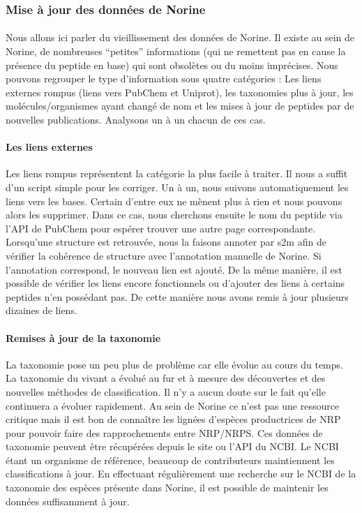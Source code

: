 \documentclass[12pt,french,twoside]{report}
\begin{document}
\subsubsection{Mise à jour des données de Norine}

\paragraph{}Nous allons ici parler du vieillissement des données de Norine.
Il existe au sein de Norine, de nombreuses ``petites'' informations (qui ne remettent pas en cause la présence du peptide en base) qui sont obsolètes ou du moins imprécises.
Nous pouvons regrouper le type d'information sous quatre catégories : Les liens externes rompus (liens vers PubChem et Uniprot), les taxonomies plus à jour, les molécules/organismes ayant changé de nom et les mises à jour de peptides par de nouvelles publications.
Analysons un à un chacun de ces cas.


\paragraph{Les liens externes}
Les liens rompus représentent la catégorie la plus facile à traiter.
Il nous a suffit d'un script simple pour les corriger.
Un à un, nous suivons automatiquement les liens vers les bases.
Certain d'entre eux ne mènent plus à rien et nous pouvons alors les supprimer.
Dans ce cas, nous cherchons ensuite le nom du peptide via l'API de PubChem pour espérer trouver une autre page correspondante.
Lorsqu'une structure est retrouvée, nous la faisons annoter par s2m afin de vérifier la cohérence de structure avec l'annotation manuelle de Norine.
Si l'annotation correspond, le nouveau lien est ajouté.
De la même manière, il est possible de vérifier les liens encore fonctionnels ou d'ajouter des liens à certains peptides n'en possédant pas.
De cette manière nous avons remis à jour plusieurs dizaines de liens.


\paragraph{Remises à jour de la taxonomie}
La taxonomie pose un peu plus de problème car elle évolue au cours du temps.
La taxonomie du vivant a évolué au fur et à mesure des découvertes et des nouvelles méthodes de classification.
Il n'y a aucun doute sur le fait qu'elle continuera a évoluer rapidement.
Au sein de Norine ce n'est pas une ressource critique mais il est bon de connaître les lignées d'espèces productrices de NRP pour pouvoir faire des rapprochements entre NRP/NRPS.
Ces données de taxonomie peuvent être récupérées depuis le site ou l'API du NCBI.
Le NCBI étant un organisme de référence, beaucoup de contributeurs maintiennent les classifications à jour.
En effectuant régulièrement une recherche sur le NCBI de la taxonomie des espèces présente dans Norine, il est possible de maintenir les données suffisamment à jour.
\end{document}
